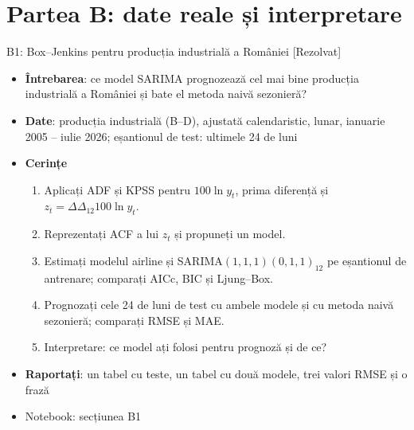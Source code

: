 \section{Partea B: date reale și interpretare}

\begin{frame}{B1: Box--Jenkins pentru producția industrială a României [Rezolvat]}
\itemsize{\footnotesize}
\begin{itemize}
\item \textbf{Întrebarea}: ce model SARIMA prognozează cel mai bine producția industrială a României și bate el metoda naivă sezonieră?
\item \textbf{Date}: producția industrială (B--D), ajustată calendaristic, lunar, ianuarie 2005 -- iulie 2026; eșantionul de test: ultimele 24 de luni
\item \textbf{Cerințe}
\begin{enumerate}
    \item Aplicați ADF și KPSS pentru $100\ln y_t$, prima diferență și $z_t = \Delta\Delta_{12}100\ln y_t$.
    \item Reprezentați ACF a lui $z_t$ și propuneți un model.
    \item Estimați modelul airline și SARIMA$(1,1,1)(0,1,1)_{12}$ pe eșantionul de antrenare; comparați AICc, BIC și Ljung--Box.
    \item Prognozați cele 24 de luni de test cu ambele modele și cu metoda naivă sezonieră; comparați RMSE și MAE.
    \item Interpretare: ce model ați folosi pentru prognoză și de ce?
\end{enumerate}
\item \textbf{Raportați}: un tabel cu teste, un tabel cu două modele, trei valori RMSE și o frază
\item Notebook: secțiunea B1
\end{itemize}
\end{frame}

